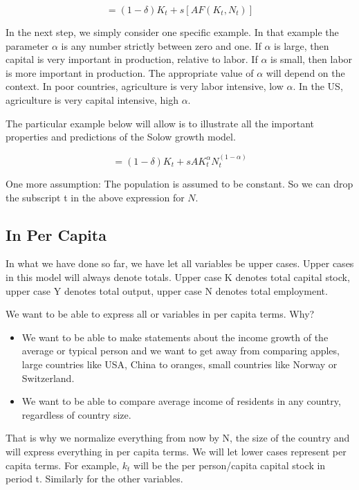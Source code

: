 \documentclass[
]{book}
\providecommand{\tightlist}{%
  \setlength{\itemsep}{0pt}\setlength{\parskip}{0pt}}
\begin{document}
\[=(1-δ) K_t+s[A F (K_t,N_t)]\]

In the next step, we simply consider one specific example. In that example the parameter \(\alpha\) is any number strictly between zero and one. If \(\alpha\) is large, then capital is very important in production, relative to labor. If \(\alpha\) is small, then labor is more important in production. The appropriate value of \(\alpha\) will depend on the context. In poor countries, agriculture is very labor intensive, low \(\alpha\). In the US, agriculture is very capital intensive, high \(\alpha\).

The particular example below will allow is to illustrate all the important properties and predictions of the Solow growth model.

\[=(1-δ) K_t+s A K_t^\alpha N_t^{(1-\alpha)}\]

One more assumption: The population is assumed to be constant. So we can drop the subscript t in the above expression for \(N\).

\hypertarget{in-per-capita}{%
\subsection{In Per Capita}\label{in-per-capita}}

In what we have done so far, we have let all variables be upper cases. Upper cases in this model will always denote totals. Upper case K denotes total capital stock, upper case Y denotes total output, upper case N denotes total employment.

We want to be able to express all or variables in per capita terms. Why?

\begin{itemize}
\tightlist
\item
  We want to be able to make statements about the income growth of the average or typical person and we want to get away from comparing apples, large countries like USA, China to oranges, small countries like Norway or Switzerland.
\item
  We want to be able to compare average income of residents in any country, regardless of country size.
\end{itemize}

That is why we normalize everything from now by N, the size of the country and will express everything in per capita terms. We will let lower cases represent per capita terms. For example, \(k_t\) will be the per person/capita capital stock in period t. Similarly for the other variables.
\end{document}
